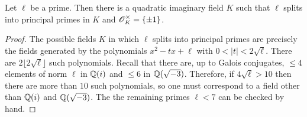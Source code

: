 \documentclass{amsart}
\begin{document}
\begin{lemma}\label{lem:silly}
  Let $\ell$ be a prime. Then there is a quadratic imaginary field $K$ such that $\ell$ splits into principal primes in $K$ and $\mathscr{O}_K^\times = \{\pm 1\}$.
\end{lemma}
\begin{proof}
  The possible fields $K$ in which $\ell$ splits into principal primes are precisely the fields generated by the polynomials $x^2 - tx + \ell$ with $0 < |t| < 2\sqrt{\ell}$. There are $2\lfloor 2\sqrt{\ell} \rfloor$ such polynomials. Recall that there are, up to Galois conjugates, $\leq 4$ elements of norm $\ell$ in $\mathbb{Q}(i)$ and $\leq 6$ in $\mathbb{Q}(\sqrt{-3})$. Therefore, if $4\sqrt{\ell} > 10$ then there are more than $10$ such polynomials, so one must correspond to a field other than $\mathbb{Q}(i)$ and $\mathbb{Q}(\sqrt{-3})$. The the remaining primes $\ell < 7$ can be checked by hand.
\end{proof}
\end{document}
